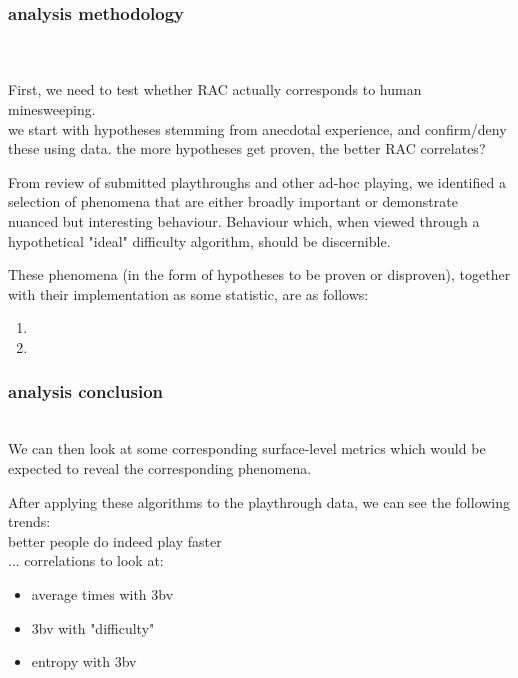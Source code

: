     \subsubsection{\textbf{analysis methodology}} \hfill \\
         \\
        First, we need to test whether RAC actually corresponds to human minesweeping. \\
        we start with hypotheses stemming from anecdotal experience, and confirm/deny these using data. the more hypotheses get proven, the better RAC correlates?
        
        From review of submitted playthroughs and other ad-hoc playing, we identified a selection of phenomena that are either broadly important or demonstrate nuanced but interesting behaviour.
        Behaviour which, when viewed through a hypothetical "ideal" difficulty algorithm, should be discernible.
        
        These phenomena (in the form of hypotheses to be proven or disproven), together with their implementation as some statistic, are as follows:
        
        \begin{enumerate}
            \item {}
            \item {}
            
    \end{enumerate}
    
    \subsubsection{\textbf{analysis conclusion}} \hfill \\
        We can then look at some corresponding surface-level metrics which would be expected to reveal the corresponding phenomena.
        
        After applying these algorithms to the playthrough data, we can see the following trends: \\
        better people do indeed play faster \\
        ...
        correlations to look at:
        \begin{itemize}
            \item average times with 3bv
            \item 3bv with "difficulty"
            \item entropy with 3bv
        \end{itemize}
        
